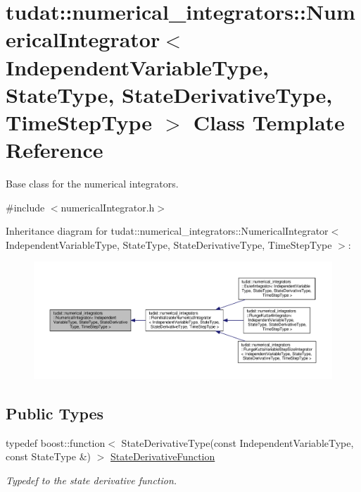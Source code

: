 \hypertarget{classtudat_1_1numerical__integrators_1_1NumericalIntegrator}{}\section{tudat\+:\+:numerical\+\_\+integrators\+:\+:Numerical\+Integrator$<$ Independent\+Variable\+Type, State\+Type, State\+Derivative\+Type, Time\+Step\+Type $>$ Class Template Reference}
\label{classtudat_1_1numerical__integrators_1_1NumericalIntegrator}


Base class for the numerical integrators.  




{\ttfamily \#include $<$numerical\+Integrator.\+h$>$}



Inheritance diagram for tudat\+:\+:numerical\+\_\+integrators\+:\+:Numerical\+Integrator$<$ Independent\+Variable\+Type, State\+Type, State\+Derivative\+Type, Time\+Step\+Type $>$\+:
\nopagebreak
\begin{figure}[H]
\begin{center}
\leavevmode
\includegraphics[width=350pt]{classtudat_1_1numerical__integrators_1_1NumericalIntegrator__inherit__graph}
\end{center}
\end{figure}
\subsection*{Public Types}
\begin{DoxyCompactItemize}
\item 
typedef boost\+::function$<$ State\+Derivative\+Type(const Independent\+Variable\+Type, const State\+Type \&) $>$ \hyperlink{classtudat_1_1numerical__integrators_1_1NumericalIntegrator_a0d0a5d48ebaf1f5ad9cd7a73b44be0fc}{State\+Derivative\+Function}
\begin{DoxyCompactList}\small\item\em Typedef to the state derivative function. \end{DoxyCompactList}\end{DoxyCompactItemize}
